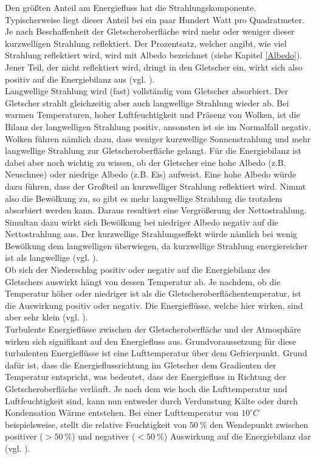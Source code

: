 \documentclass[11pt,a4paper]{article}
\begin{document}
Den größten Anteil am Energiefluss hat die Strahlungskomponente. Typischerweise liegt dieser Anteil bei ein paar Hundert Watt pro Quadratmeter. Je nach Beschaffenheit der Gletscheroberfläche wird mehr oder weniger dieser kurzwelligen Strahlung reflektiert. Der Prozentsatz, welcher angibt, wie viel Strahlung reflektiert wird, wird mit Albedo bezeichnet (siehe Kapitel \ref{Albedo}). Jener Teil, der nicht reflektiert wird, dringt in den Gletscher ein, wirkt sich also positiv auf die Energiebilanz aus (vgl. \cite[16]{Themicroclimateofvalleyglaciers}).\\

Langwellige Strahlung wird (fast) vollständig vom Gletscher absorbiert. Der Gletscher strahlt gleichzeitig aber auch langwellige Strahlung wieder ab. Bei warmen Temperaturen, hoher Luftfeuchtigkeit und Präsenz von Wolken, ist die Bilanz der langwelligen Strahlung positiv, ansonsten ist sie im Normalfall negativ.\\
Wolken führen nämlich dazu, dass weniger kurzwellige Sonnenstrahlung und mehr langwellige Strahlung zur Gletscheroberfläche gelangt. Für die Energiebilanz ist dabei aber noch wichtig zu wissen, ob der Gletscher eine hohe Albedo (z.B. Neuschnee) oder niedrige Albedo (z.B. Eis) aufweist. Eine hohe Albedo würde dazu führen, dass der Großteil an kurzwelliger Strahlung reflektiert wird. Nimmt also die Bewölkung zu, so gibt es mehr langwellige Strahlung die trotzdem absorbiert werden kann. Daraus resultiert eine Vergrößerung der Nettostrahlung.\\
Simultan dazu wirkt sich Bewölkung bei niedriger Albedo negativ auf die Nettostrahlung aus. Der kurzwellige Strahlungseffekt würde nämlich bei wenig Bewölkung dem langwelligen überwiegen, da kurzwellige Strahlung energiereicher ist als langwellige (vgl. \cite[16, 17]{Themicroclimateofvalleyglaciers}).\\

Ob sich der Niederschlag positiv oder negativ auf die Energiebilanz des Gletschers auswirkt hängt von dessen Temperatur ab. Je nachdem, ob die Temperatur höher oder niedriger ist als die Gletscheroberflächentemperatur, ist die Auswirkung positiv oder negativ. Die Energieflüsse, welche hier wirken, sind aber sehr klein (vgl. \cite[17]{Themicroclimateofvalleyglaciers}).\\

Turbulente Energieflüsse zwischen der Gletscheroberfläche und der Atmosphäre wirken sich signifikant auf den Energiefluss aus. Grundvoraussetzung für diese turbulenten Energieflüsse ist eine Lufttemperatur über dem Gefrierpunkt. Grund dafür ist, dass die Energieflussrichtung im Gletscher dem Gradienten der Temperatur entspricht, was bedeutet, dass der Energiefluss in Richtung der Gletscheroberfläche verläuft. Je nach dem wie hoch die Lufttemperatur und Luftfeuchtigkeit sind, kann nun entweder durch Verdunstung Kälte oder durch Kondensation Wärme entstehen. Bei einer Lufttemperatur von $10^\circ C$ beispielsweise, stellt die relative Feuchtigkeit von $50~\%$ den Wendepunkt zwischen positiver ($>50~\%$) und negativer ($<50~\%$) Auswirkung auf die Energiebilanz dar (vgl. \cite[17]{Themicroclimateofvalleyglaciers}).\\
\end{document}
